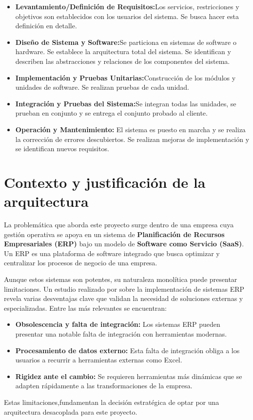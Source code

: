 \documentclass[12pt,letterpaper,spanish]{report}
\begin{document}
\begin{itemize}
  \item \textbf{Levantamiento/Definición de Requisitos:}Los servicios, restricciones y objetivos son establecidos con los usuarios del sistema. Se busca hacer esta definición en detalle.
  \item \textbf{Diseño de Sistema y Software:}Se particiona en sistemas de software o hardware. Se establece la arquitectura total del sistema. Se identifican y describen las abstracciones y relaciones de los componentes del sistema.
  \item \textbf{Implementación y Pruebas Unitarias:}Construcción de los módulos y unidades de software. Se realizan pruebas de cada unidad.
  \item \textbf{Integración y Pruebas del Sistema:}Se integran todas las unidades, se prueban en conjunto y se entrega el conjunto probado al cliente.
  \item \textbf{Operación y Mantenimiento:} El sistema es puesto en marcha y se realiza la corrección de errores descubiertos. Se realizan mejoras de implementación y se identifican nuevos requisitos.
\end{itemize}




\section{Contexto y justificación de la arquitectura}
\label{sec:contexto_justificacion}

La problemática que aborda este proyecto surge dentro de una empresa cuya gestión operativa se apoya en un sistema de \textbf{Planificación de Recursos Empresariales (ERP)} bajo un modelo de \textbf{Software como Servicio (SaaS)}. Un ERP es una plataforma de software integrado que busca optimizar y centralizar los procesos de negocio de una empresa.

Aunque estos sistemas son potentes, su naturaleza monolítica puede presentar limitaciones. Un estudio realizado por \citet{Correal2021} sobre la implementación de sistemas ERP revela varias desventajas clave que validan la necesidad de soluciones externas y especializadas. Entre las más relevantes se encuentran:
\begin{itemize}
    \item \textbf{Obsolescencia y falta de integración:} Los sistemas ERP pueden presentar una notable falta de integración con herramientas modernas.
    \item \textbf{Procesamiento de datos externo:} Esta falta de integración obliga a los usuarios a recurrir a herramientas externas como Excel.
    \item \textbf{Rigidez ante el cambio:} Se requieren herramientas más dinámicas que se adapten rápidamente a las transformaciones de la empresa.
\end{itemize}
Estas limitaciones,fundamentan la decisión estratégica de optar por una arquitectura desacoplada para este proyecto.
\end{document}
